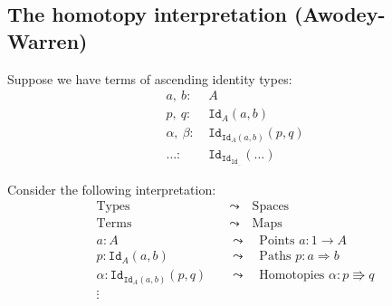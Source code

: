 \documentclass[11pt]{article}
\newcommand{\myemph}[1]{\textbf{#1}}    %
\newcommand{\id}[1]{\texttt{Id}_{#1}}
\begin{document}

%
%
%

\subsection*{The homotopy interpretation (Awodey-Warren)}

Suppose we have terms of ascending identity types:
\begin{align*}
  a,\ b :&\ A     \\ 
  p,\ q :&\ \id{A}(a, b)    \\ 
   \alpha,\ \beta :&\ \id{\id{A}(a,b)}{(p, q)}   \\ 
 \ldots :&\ \id{\id{\id{\ldots}}}{(\ldots)}   
\end{align*}

Consider the following interpretation:
%
\begin{align*}
\text{Types} &\quad\leadsto\quad  \text{Spaces} \\
\text{Terms} &\quad\leadsto\quad  \text{Maps} \\
a : A &\quad\leadsto\quad  \text{Points $a : 1 \rightarrow A$} \\
p : \id{A}(a, b) &\quad\leadsto\quad  \text{Paths $p: a \Rightarrow b$} \\
\alpha : \id{\id{A}(a, b)}(p, q) &\quad\leadsto\quad  \text{Homotopies $\alpha: p\Rrightarrow q$} \\
\vdots &
\end{align*}
\end{document}
